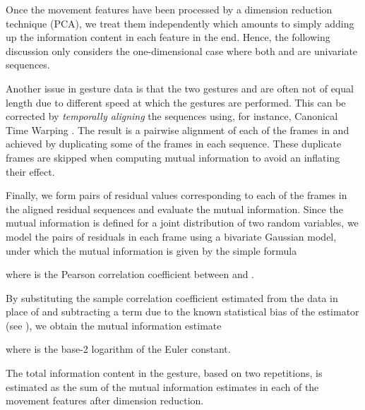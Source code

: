 \documentclass{sig-alternate-10pt}
\begin{document}
Once the movement features have been processed by a dimension reduction technique (PCA), we treat them independently which amounts to simply adding up the information content in each feature in the end. Hence, the following discussion only considers the one-dimensional case where both  and  are univariate sequences.

Another issue in gesture data is that the two gestures  and  are often not of equal length due to different speed at which the
gestures are performed. This can be corrected by \emph{temporally aligning} the sequences using, for instance,
Canonical Time Warping \cite{zhou2009canonical}. The result is a pairwise alignment of each of the frames in  and  achieved
by duplicating some of the frames in each sequence. These duplicate frames are skipped when computing mutual information
to avoid an inflating their effect. 

Finally, we form pairs of residual values  corresponding to each of the frames in the aligned residual sequences and evaluate the mutual information.
Since the mutual information is defined for a joint distribution of two random variables, we model the pairs  of residuals in each frame  using a bivariate Gaussian model, under which the
mutual information is given by the simple formula

where  is the Pearson correlation coefficient between  and .

By substituting the sample correlation coefficient estimated from the data in place of  and subtracting a term due to the known statistical bias of the estimator (see \cite{oulasvirta2013information}), we obtain
the mutual information estimate

where  is the base-2 logarithm of the Euler constant.

The total information content in the gesture, based on two repetitions, is estimated as the sum of the mutual information estimates in each of the movement features after dimension reduction.
\end{document}
